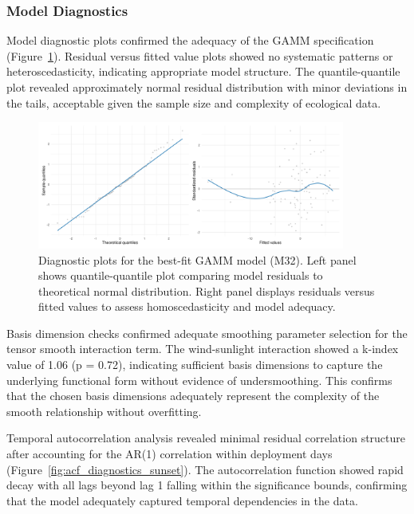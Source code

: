 \subsubsection{Model Diagnostics}

Model diagnostic plots confirmed the adequacy of the GAMM specification (Figure~\ref{fig:model_diagnostics_sunset}). Residual versus fitted value plots showed no systematic patterns or heteroscedasticity, indicating appropriate model structure. The quantile-quantile plot revealed approximately normal residual distribution with minor deviations in the tails, acceptable given the sample size and complexity of ecological data.

\begin{figure}[htbp]
    \centering
    \includegraphics[width=0.9\textwidth]{supplemental/results/sunset/figures/diag_qq_and_residuals_1x2.png}
    \caption{Diagnostic plots for the best-fit GAMM model (M32). Left panel shows quantile-quantile plot comparing model residuals to theoretical normal distribution. Right panel displays residuals versus fitted values to assess homoscedasticity and model adequacy.}
    \label{fig:model_diagnostics_sunset}
\end{figure}

Basis dimension checks confirmed adequate smoothing parameter selection for the tensor smooth interaction term. The wind-sunlight interaction showed a k-index value of 1.06 (p = 0.72), indicating sufficient basis dimensions to capture the underlying functional form without evidence of undersmoothing. This confirms that the chosen basis dimensions adequately represent the complexity of the smooth relationship without overfitting.

Temporal autocorrelation analysis revealed minimal residual correlation structure after accounting for the AR(1) correlation within deployment days (Figure~\ref{fig:acf_diagnostics_sunset}). The autocorrelation function showed rapid decay with all lags beyond lag 1 falling within the significance bounds, confirming that the model adequately captured temporal dependencies in the data. 

